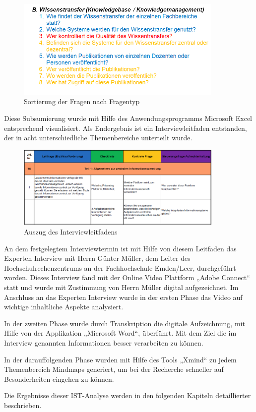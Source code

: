 \begin{figure}[h!]
	\centering
	\includegraphics[width=10cm]{kapitel/gruppe2/bilder/sortierung_fragentyp}
	\caption{Sortierung der Fragen nach Fragentyp}
	\label{fig_sortierung_fragentyp}
\end{figure}

Diese Subsumierung wurde mit Hilfe des Anwendungsprogramms Microsoft Excel entsprechend visualisiert. Als Endergebnis  ist ein Interviewleitfaden entstanden, der in acht unterschiedliche Themenbereiche unterteilt wurde.

\begin{figure}[h!]
	\centering
	\includegraphics[width=10cm]{kapitel/gruppe2/bilder/auszug_leitfaden}
	\caption{Auszug des Interviewleitfadens}
	\label{fig_auszug_interviewleitfaden}
\end{figure}

An dem festgelegtem Interviewtermin ist mit Hilfe von diesem Leitfaden das Experten Interview mit Herrn Günter Müller, dem Leiter des Hochschulrechenzentrums an der Fachhochschule Emden/Leer, durchgeführt worden. Dieses Interview fand mit der Online Video Plattform „Adobe Connect“ statt und wurde mit Zustimmung von Herrn Müller digital aufgezeichnet. Im Anschluss an das Experten Interview wurde in der ersten Phase das Video auf wichtige inhaltliche Aspekte analysiert.

In der zweiten Phase wurde durch Transkription die digitale Aufzeichnung, mit Hilfe von der Applikation „Microsoft Word“, überführt. Mit dem Ziel die im Interview genannten Informationen besser verarbeiten zu können.

In der darauffolgenden Phase wurden mit Hilfe des Tools „Xmind“ zu jedem Themenbereich Mindmaps generiert, um bei der Recherche schneller auf Besonderheiten eingehen zu können.

Die Ergebnisse dieser IST-Analyse werden in den folgenden Kapiteln detaillierter beschrieben. 
